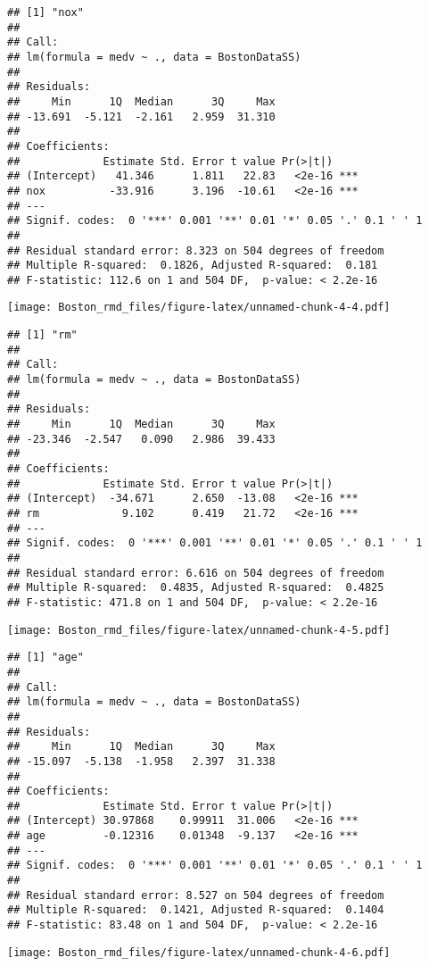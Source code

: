 \documentclass[]{article}
\begin{document}
\begin{verbatim}
## [1] "nox"
## 
## Call:
## lm(formula = medv ~ ., data = BostonDataSS)
## 
## Residuals:
##     Min      1Q  Median      3Q     Max 
## -13.691  -5.121  -2.161   2.959  31.310 
## 
## Coefficients:
##             Estimate Std. Error t value Pr(>|t|)    
## (Intercept)   41.346      1.811   22.83   <2e-16 ***
## nox          -33.916      3.196  -10.61   <2e-16 ***
## ---
## Signif. codes:  0 '***' 0.001 '**' 0.01 '*' 0.05 '.' 0.1 ' ' 1
## 
## Residual standard error: 8.323 on 504 degrees of freedom
## Multiple R-squared:  0.1826, Adjusted R-squared:  0.181 
## F-statistic: 112.6 on 1 and 504 DF,  p-value: < 2.2e-16
\end{verbatim}

\texttt{[image: Boston\_rmd\_files/figure-latex/unnamed-chunk-4-4.pdf]}

\begin{verbatim}
## [1] "rm"
## 
## Call:
## lm(formula = medv ~ ., data = BostonDataSS)
## 
## Residuals:
##     Min      1Q  Median      3Q     Max 
## -23.346  -2.547   0.090   2.986  39.433 
## 
## Coefficients:
##             Estimate Std. Error t value Pr(>|t|)    
## (Intercept)  -34.671      2.650  -13.08   <2e-16 ***
## rm             9.102      0.419   21.72   <2e-16 ***
## ---
## Signif. codes:  0 '***' 0.001 '**' 0.01 '*' 0.05 '.' 0.1 ' ' 1
## 
## Residual standard error: 6.616 on 504 degrees of freedom
## Multiple R-squared:  0.4835, Adjusted R-squared:  0.4825 
## F-statistic: 471.8 on 1 and 504 DF,  p-value: < 2.2e-16
\end{verbatim}

\texttt{[image: Boston\_rmd\_files/figure-latex/unnamed-chunk-4-5.pdf]}

\begin{verbatim}
## [1] "age"
## 
## Call:
## lm(formula = medv ~ ., data = BostonDataSS)
## 
## Residuals:
##     Min      1Q  Median      3Q     Max 
## -15.097  -5.138  -1.958   2.397  31.338 
## 
## Coefficients:
##             Estimate Std. Error t value Pr(>|t|)    
## (Intercept) 30.97868    0.99911  31.006   <2e-16 ***
## age         -0.12316    0.01348  -9.137   <2e-16 ***
## ---
## Signif. codes:  0 '***' 0.001 '**' 0.01 '*' 0.05 '.' 0.1 ' ' 1
## 
## Residual standard error: 8.527 on 504 degrees of freedom
## Multiple R-squared:  0.1421, Adjusted R-squared:  0.1404 
## F-statistic: 83.48 on 1 and 504 DF,  p-value: < 2.2e-16
\end{verbatim}

\texttt{[image: Boston\_rmd\_files/figure-latex/unnamed-chunk-4-6.pdf]}
\end{document}
